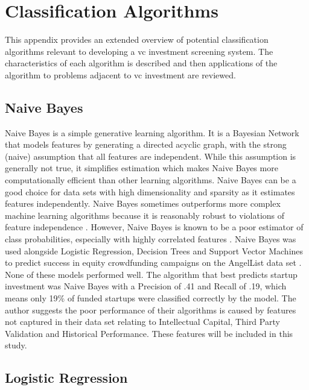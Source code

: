 \chapter{Classification Algorithms}
\label{appendix:classification_algorithms}

This appendix provides an extended overview of potential classification algorithms relevant to developing a \gls{vc} investment screening system. The characteristics of each algorithm is described and then applications of the algorithm to problems adjacent to \gls{vc} investment are reviewed.

\section{Naive Bayes}

Naive Bayes is a simple generative learning algorithm. It is a Bayesian Network that models features by generating a directed acyclic graph, with the strong (naive) assumption that all features are independent. While this assumption is generally not true, it simplifies estimation which makes Naive Bayes more computationally efficient than other learning algorithms. Naive Bayes can be a good choice for data sets with high dimensionality and sparsity as it estimates features independently. Naive Bayes sometimes outperforms more complex machine learning algorithms because it is reasonably robust to violations of feature independence \cite{kotsiantis2007}. However, Naive Bayes is known to be a poor estimator of class probabilities, especially with highly correlated features \cite{friedman2001}. Naive Bayes was used alongside Logistic Regression, Decision Trees and Support Vector Machines to predict success in equity crowdfunding campaigns on the AngelList data set \cite{beckwith2016}. None of these models performed well. The algorithm that best predicts startup investment was Naive Bayes with a Precision of .41 and Recall of .19, which means only 19\% of funded startups were classified correctly by the model. The author suggests the poor performance of their algorithms is caused by features not captured in their data set relating to Intellectual Capital, Third Party Validation and Historical Performance. These features will be included in this study.

\section{Logistic Regression}

